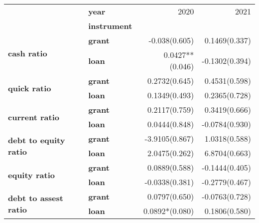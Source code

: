 \begin{tabular}{llrr}
\toprule
                     & \textbf{year} &                                    2020 &                                    2021 \\
{} & \textbf{instrument} &                                         &                                         \\
\midrule
\multirow{2}{*}{\textbf{cash ratio}} & \textbf{grant} &   -0.038\space\space\space\space(0.605) &   0.1469\space\space\space\space(0.337) \\
                     & \textbf{loan} &             0.0427**\space\space(0.046) &  -0.1302\space\space\space\space(0.394) \\
\cline{1-4}
\multirow{2}{*}{\textbf{quick ratio}} & \textbf{grant} &   0.2732\space\space\space\space(0.645) &   0.4531\space\space\space\space(0.598) \\
                     & \textbf{loan} &   0.1349\space\space\space\space(0.493) &   0.2365\space\space\space\space(0.728) \\
\cline{1-4}
\multirow{2}{*}{\textbf{current ratio}} & \textbf{grant} &   0.2117\space\space\space\space(0.759) &   0.3419\space\space\space\space(0.666) \\
                     & \textbf{loan} &   0.0444\space\space\space\space(0.848) &  -0.0784\space\space\space\space(0.930) \\
\cline{1-4}
\multirow{2}{*}{\textbf{debt to equity ratio}} & \textbf{grant} &  -3.9105\space\space\space\space(0.867) &   1.0318\space\space\space\space(0.588) \\
                     & \textbf{loan} &   2.0475\space\space\space\space(0.262) &   6.8704\space\space\space\space(0.663) \\
\cline{1-4}
\multirow{2}{*}{\textbf{equity ratio}} & \textbf{grant} &   0.0889\space\space\space\space(0.588) &  -0.1444\space\space\space\space(0.405) \\
                     & \textbf{loan} &  -0.0338\space\space\space\space(0.381) &  -0.2779\space\space\space\space(0.467) \\
\cline{1-4}
\multirow{2}{*}{\textbf{debt to assest ratio}} & \textbf{grant} &   0.0797\space\space\space\space(0.650) &  -0.0763\space\space\space\space(0.728) \\
                     & \textbf{loan} &        0.0892*\space\space\space(0.080) &   0.1806\space\space\space\space(0.580) \\
\bottomrule
\end{tabular}
